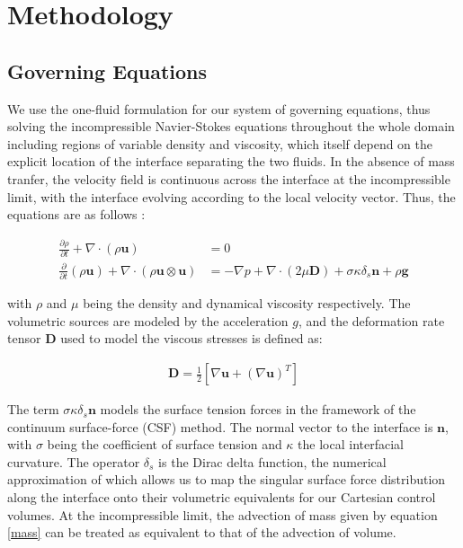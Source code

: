 \setchapterpreamble[u]{\margintoc}
\chapter{Methodology}
 
\section{Governing Equations}

We use the one-fluid formulation for our system of governing equations, thus solving 
the incompressible Navier-Stokes equations throughout the whole domain including regions 
of variable density and viscosity, which itself depend on the explicit 
location of the interface separating the two fluids.
In the absence of mass tranfer, the velocity field is continuous across
the interface at the incompressible limit, with the interface evolving according to the local velocity vector.  
Thus, the equations are as follows :  


\begin{align} 
	\frac{\partial \rho}{\partial t} + \nabla\cdot \left(\rho\boldsymbol{u}\right) &= 0 \label{mass} \\
	\frac{\partial}{\partial t} \left(\rho\boldsymbol{u}\right) + \nabla \cdot \left(\rho\boldsymbol{u}\otimes\boldsymbol{u}\right)  &= -\nabla p + \nabla \cdot \left(2 \mu \boldsymbol{D}\right) + \sigma \kappa \delta_{s}\boldsymbol{n} + \rho \boldsymbol{g}
\label{nseqn}
\end{align}


with $\rho$ and $\mu$ being the density and dynamical viscosity respectively. 
The volumetric sources are modeled by the acceleration $g$, and the 
deformation rate tensor $\boldsymbol{D}$ used to model the viscous stresses is defined as:  

\begin{align}
	\boldsymbol{D} = \frac{1}{2}\left[\nabla \boldsymbol{u} + \left(\nabla \boldsymbol{u}\right)^{T}\right]  
\end{align}


The term $\sigma \kappa \delta_{s}\boldsymbol{n}$ models the surface tension forces in the 
framework of the continuum surface-force (CSF) method. The normal vector to the interface 
is $\boldsymbol{n}$, with $\sigma$ being the coefficient of surface tension and $\kappa$ the 
local interfacial curvature. The operator $\delta_{s}$ is the Dirac delta function, 
the numerical approximation of which allows us to map the singular surface force distribution
along the interface onto their volumetric equivalents for our Cartesian control volumes. 
At the incompressible limit, the advection of mass given by equation \ref{mass} can be 
treated as equivalent to that of the advection of volume.

